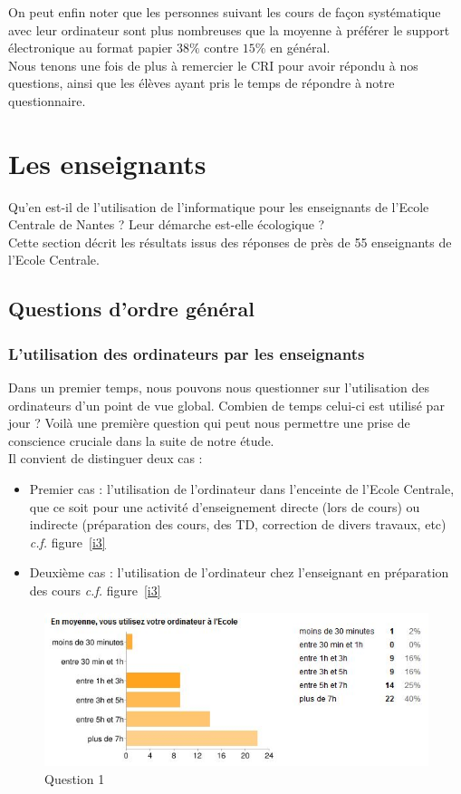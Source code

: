\documentclass[a4paper,11pt,french]{article}
\begin{document}
On peut enfin noter que les personnes suivant les cours de façon systématique avec leur ordinateur sont plus nombreuses que la moyenne à préférer le support électronique au format papier $38\%$ contre $15\%$ en général.\\

Nous tenons une fois de plus à remercier le CRI pour avoir répondu à nos questions, ainsi que les élèves ayant pris le temps de répondre à notre questionnaire.


\section{Les enseignants}
Qu'en est-il de l'utilisation de l'informatique pour les enseignants de l'Ecole Centrale de Nantes ? Leur démarche est-elle écologique ?\\

Cette section décrit les résultats issus des réponses de près de 55 enseignants de l'Ecole Centrale.

\subsection{Questions d'ordre général}

\subsubsection{L’utilisation des ordinateurs par les enseignants}

Dans un premier temps, nous pouvons nous questionner sur l'utilisation des ordinateurs d'un point de vue global. Combien de temps celui-ci est utilisé par jour ? Voilà une première question qui peut nous permettre une prise de conscience cruciale dans la suite de notre étude.\\

Il convient de distinguer deux cas :
\begin{itemize}
\item Premier cas : l'utilisation de l'ordinateur dans l'enceinte de l'Ecole Centrale, que ce soit pour une activité d'enseignement directe (lors de cours) ou indirecte (préparation des cours, des TD, correction de divers travaux, etc) \textit{c.f.} figure~\vref{i3}
\item Deuxième cas : l'utilisation de l'ordinateur chez l'enseignant en préparation des cours \textit{c.f.} figure~\vref{i3}
\end{itemize}

\begin{figure}[h!]
\includegraphics[width=\textwidth]{i6.PNG}
\caption{Question 1}
\label{i6}
\end{figure}
\end{document}
